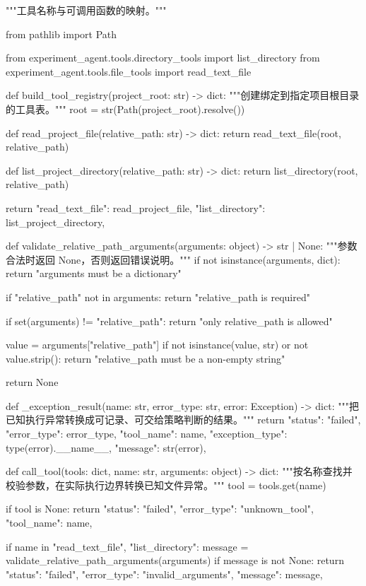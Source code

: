 \begin{Code}
"""工具名称与可调用函数的映射。"""

from pathlib import Path

from experiment_agent.tools.directory_tools import list_directory
from experiment_agent.tools.file_tools import read_text_file


def build_tool_registry(project_root: str) -> dict:
    """创建绑定到指定项目根目录的工具表。"""
    root = str(Path(project_root).resolve())

    def read_project_file(relative_path: str) -> dict:
        return read_text_file(root, relative_path)

    def list_project_directory(relative_path: str) -> dict:
        return list_directory(root, relative_path)

    return {
        "read_text_file": read_project_file,
        "list_directory": list_project_directory,
    }


def validate_relative_path_arguments(arguments: object) -> str | None:
    """参数合法时返回 None，否则返回错误说明。"""
    if not isinstance(arguments, dict):
        return "arguments must be a dictionary"

    if "relative_path" not in arguments:
        return "relative_path is required"

    if set(arguments) != {"relative_path"}:
        return "only relative_path is allowed"

    value = arguments["relative_path"]
    if not isinstance(value, str) or not value.strip():
        return "relative_path must be a non-empty string"

    return None


def _exception_result(name: str, error_type: str, error: Exception) -> dict:
    """把已知执行异常转换成可记录、可交给策略判断的结果。"""
    return {
        "status": "failed",
        "error_type": error_type,
        "tool_name": name,
        "exception_type": type(error).__name__,
        "message": str(error),
    }


def call_tool(tools: dict, name: str, arguments: object) -> dict:
    """按名称查找并校验参数，在实际执行边界转换已知文件异常。"""
    tool = tools.get(name)

    if tool is None:
        return {
            "status": "failed",
            "error_type": "unknown_tool",
            "tool_name": name,
        }

    if name in {"read_text_file", "list_directory"}:
        message = validate_relative_path_arguments(arguments)
        if message is not None:
            return {
                "status": "failed",
                "error_type": "invalid_arguments",
                "message": message,
            }


\end{Code}
